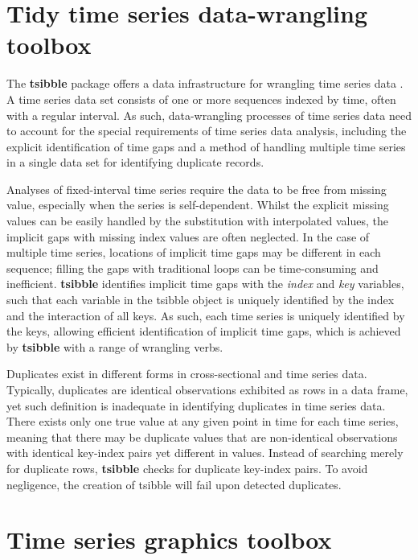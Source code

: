 \documentclass{aucklandthesis}
\begin{document}
\hypertarget{tidy-time-series-data-wrangling-toolbox}{%
\section{Tidy time series data-wrangling toolbox}\label{tidy-time-series-data-wrangling-toolbox}}

The \textbf{tsibble} package offers a data infrastructure for wrangling time series data \autocite{tsibble}. A time series data set consists of one or more sequences indexed by time, often with a regular interval. As such, data-wrangling processes of time series data need to account for the special requirements of time series data analysis, including the explicit identification of time gaps and a method of handling multiple time series in a single data set for identifying duplicate records.

Analyses of fixed-interval time series require the data to be free from missing value, especially when the series is self-dependent. Whilst the explicit missing values can be easily handled by the substitution with interpolated values, the implicit gaps with missing index values are often neglected. In the case of multiple time series, locations of implicit time gaps may be different in each sequence; filling the gaps with traditional loops can be time-consuming and inefficient. \textbf{tsibble} identifies implicit time gaps with the \emph{index} and \emph{key} variables, such that each variable in the tsibble object is uniquely identified by the index and the interaction of all keys. As such, each time series is uniquely identified by the keys, allowing efficient identification of implicit time gaps, which is achieved by \textbf{tsibble} with a range of wrangling verbs.

Duplicates exist in different forms in cross-sectional and time series data. Typically, duplicates are identical observations exhibited as rows in a data frame, yet such definition is inadequate in identifying duplicates in time series data. There exists only one true value at any given point in time for each time series, meaning that there may be duplicate values that are non-identical observations with identical key-index pairs yet different in values. Instead of searching merely for duplicate rows, \textbf{tsibble} checks for duplicate key-index pairs. To avoid negligence, the creation of tsibble will fail upon detected duplicates.

\hypertarget{time-series-graphics-toolbox}{%
\section{Time series graphics toolbox}\label{time-series-graphics-toolbox}}
\end{document}
